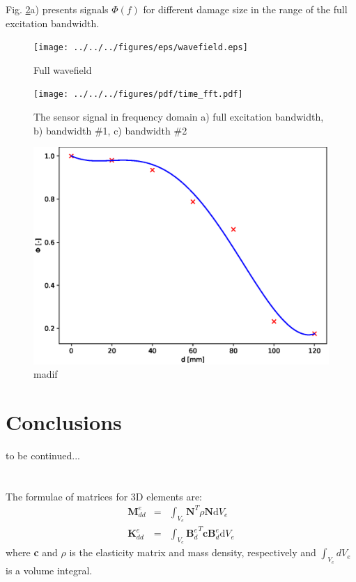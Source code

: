 \documentclass[a4paper,12pt]{article}
\newcommand{\rmd}{\mathrm{d}}
\begin{document}
{Fig. \ref{fig:signals}a) presents signals \(\Phi(f)\) for different damage size in the range of the full excitation bandwidth. 
\begin{figure}
	\begin{center}
		\texttt{[image: ../../../figures/eps/wavefield.eps]}
	\end{center}
	\caption{Full wavefield}
	\label{fig:wavefield}
\end{figure}
\begin{figure}
	\begin{center}
		\texttt{[image: ../../../figures/pdf/time\_fft.pdf]}
	\end{center}
	\caption{The sensor signal in frequency domain a) full excitation bandwidth, b) bandwidth \#1, c) bandwidth \#2}
	\label{fig:signals}
\end{figure}
\begin{figure}
	\begin{center}
		\includegraphics[width=1\linewidth]{../../../figures/eps/madif.eps}
	\end{center}
	\caption{madif}
	\label{fig:madif}
\end{figure}
\section{Conclusions}
to be continued...
\appendix
\section{}
\label{app:matrices}
The formulae of matrices for 3D elements are:
\begin{eqnarray}
\textbf{M}_{dd}^e & = & \int_{V_e}\textbf{N}^T\rho \textbf{N}\rmd V_e\\
\textbf{K}_{dd}^e & = & \int_{V_e}{\textbf{B}_d^e}^T\textbf{c}\textbf{B}_d^e\rmd V_e
\end{eqnarray}
where \textbf{c} and \(\rho\) is the elasticity matrix and mass density, 
respectively and \(\int_{V_e}dV_e\) is a volume integral.

}
\end{document}
